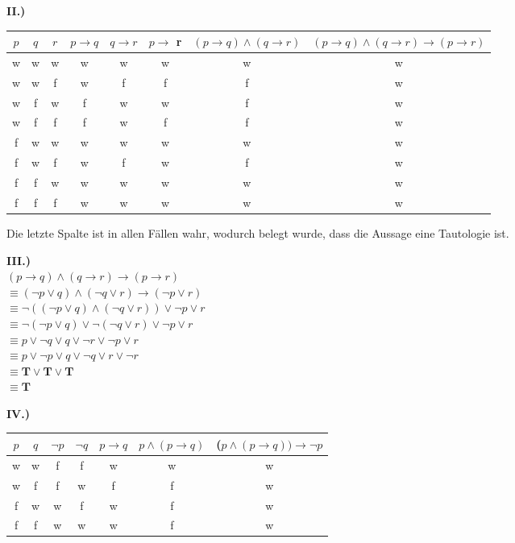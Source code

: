 \documentclass[12pt]{scrartcl}
\begin{document}
\vspace{50px}
\textbf{II.)}
\begin{center}
    \begin{tabular}{ c | c | c | c | c | c | c | c }
        $p$ & $q$ & $r$ & $p \rightarrow q$ & $q \rightarrow r$ & $p \rightarrow$ r & $(p \rightarrow q) \land (q \rightarrow r)$ & $(p \rightarrow q) \land (q \rightarrow r) \rightarrow (p \rightarrow r)$\\ 
        \hline
        w & w & w & w & w & w & w & w \\ 
        w & w & f & w & f & f & f & w \\ 
        w & f & w & f & w & w & f & w \\ 
        w & f & f & f & w & f & f & w \\ 
        f & w & w & w & w & w & w & w \\ 
        f & w & f & w & f & w & f & w \\ 
        f & f & w & w & w & w & w & w \\ 
        f & f & f & w & w & w & w & w \\ 
    \end{tabular}
\end{center}

Die letzte Spalte ist in allen Fällen wahr, wodurch belegt wurde, dass die
Aussage eine Tautologie ist.


\textbf{III.)}\\
$(p \rightarrow q) \land ( q \rightarrow r) \rightarrow (p \rightarrow r)$\\
$\equiv (\lnot p \lor q) \land (\lnot q \lor r) \rightarrow (\lnot p \lor r)$\\
$\equiv \lnot((\lnot p \lor q) \land (\lnot q \lor r)) \lor \lnot p \lor r$\\
$\equiv \lnot (\lnot p \lor q) \lor \lnot (\lnot q \lor r) \lor \lnot p \lor r$\\
$\equiv p \lor \lnot q \lor q \lor \lnot r \lor \lnot p \lor r$\\
$\equiv p \lor \lnot p \lor q \lor \lnot q \lor r \lor \lnot r $\\
$\equiv \mathbf{T} \lor \mathbf{T} \lor \mathbf{T}$\\
$\equiv \mathbf{T}$


\vspace{50px}
\textbf{IV.)}
\begin{center}
    \begin{tabular}{ c | c | c | c | c | c | c}
        $p$ & $q$ & $\lnot p$ & $\lnot q$ & $p \rightarrow q$ & $p \land (p \rightarrow q)$ & ($p \land (p \rightarrow q)) \rightarrow \lnot p$\\ 
        \hline
        w & w & f & f & w & w & w \\ 
        w & f & f & w & f & f & w \\ 
        f & w & w & f & w & f & w \\ 
        f & f & w & w & w & f & w \\ 
    \end{tabular}
\end{center}
\end{document}
